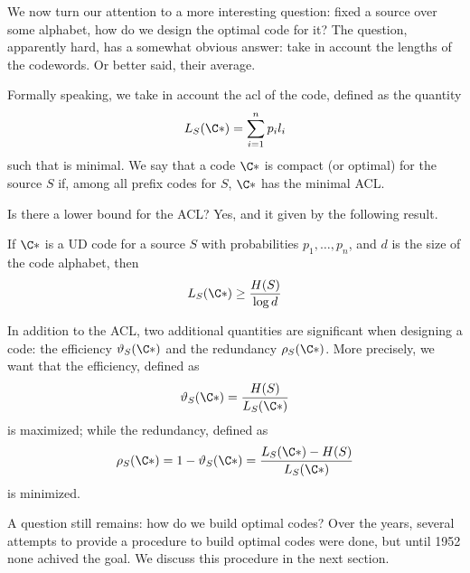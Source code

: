 \documentclass{subfiles}
\begin{document}
    We now turn our attention to a more interesting question: 
        fixed a source over some alphabet, how do we design the optimal code for it?
        The question, apparently hard, has a somewhat obvious answer:
        take in account the lengths of the codewords. Or better said, 
        their average.

    Formally speaking, we take in account the \gls{acl} of the code, 
        defined as the quantity
        \[
            \acl = \sum_{i = 1}^{n} p_{i}l_{i}
        \]
        such that is minimal. We say that a code \(\C*\) is compact (or optimal) for the source 
        \(S\) if, among all prefix codes for \(S\), \(\C*\) has the minimal ACL.

    \begin{remark*}
        Is there a lower bound for the ACL? Yes, and it given by the following result.
        \begin{lemma*}[Shannon]
            If \(\C*\) is a UD code for a source \(S\) with probabilities 
            \(p_{1}, \ldots, p_{n}\), and \(d\) is the size of the code alphabet,
            then
            \[
                \acl \ge \frac{H(S)}{\log d}
            \]
        \end{lemma*}
    \end{remark*}

    In addition to the ACL, two additional quantities are significant when designing a 
        code: the efficiency \(\eff\) and the redundancy \(\red\). More precisely,
        we want that the efficiency, defined as 
        \[
            \eff = \frac{H(S)}{\acl}
        \]
        is maximized; while the redundancy, defined as 
        \[
            \red = 1 - \eff = \frac{\acl - H(S)}{\acl}
        \]
        is minimized.

    A question still remains: how do we build optimal codes? 
        Over the years, several attempts to provide a procedure to build optimal codes 
        were done, but until 1952 none achived the goal. 
        We discuss this procedure in the next section.
        \clearpage
\end{document}
